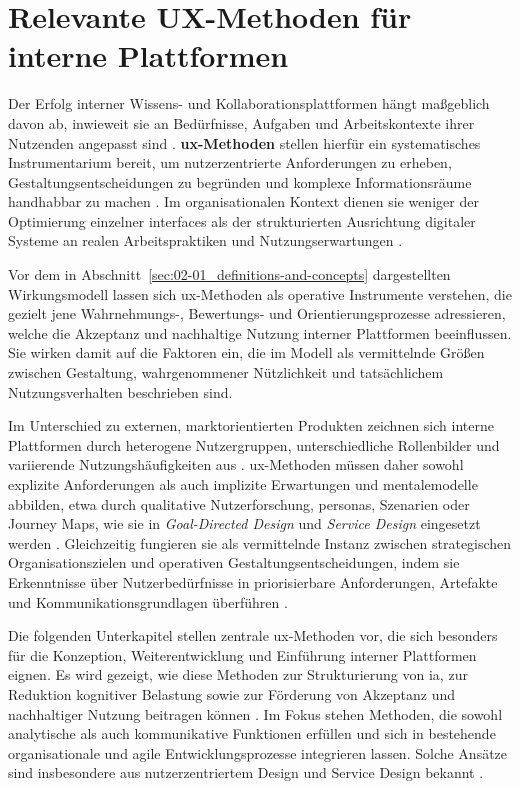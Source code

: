 \section{Relevante UX-Methoden für interne Plattformen}
\label{sec:02-02_ux-methods}

Der Erfolg interner Wissens- und Kollaborationsplattformen hängt maßgeblich davon ab, inwieweit sie an Bedürfnisse, Aufgaben und Arbeitskontexte ihrer Nutzenden angepasst sind \cite{300:FraunhoferIESE2018,406:Albers2015}. \textbf{\Gls{ux}-Methoden} stellen hierfür ein systematisches Instrumentarium bereit, um nutzerzentrierte Anforderungen zu erheben, Gestaltungsentscheidungen zu begründen und komplexe Informationsräume handhabbar zu machen \cite{401:Garrett2011,408:Hassenzahl2010,409:Cooper2014}. Im organisationalen Kontext dienen sie weniger der Optimierung einzelner \Glspl{interface} als der strukturierten Ausrichtung digitaler Systeme an realen Arbeitspraktiken und Nutzungserwartungen \cite{406:Albers2015,303:Rosenfeld2015,410:Stickdorn2018}.

Vor dem in Abschnitt~\ref{sec:02-01_definitions-and-concepts} dargestellten Wirkungsmodell lassen sich \Gls{ux}-Methoden als operative Instrumente verstehen, die gezielt jene Wahrnehmungs-, Bewertungs- und Orientierungsprozesse adressieren, welche die Akzeptanz und nachhaltige Nutzung interner Plattformen beeinflussen. Sie wirken damit auf die Faktoren ein, die im Modell als vermittelnde Größen zwischen Gestaltung, wahrgenommener Nützlichkeit und tatsächlichem Nutzungsverhalten beschrieben sind.

Im Unterschied zu externen, marktorientierten Produkten zeichnen sich interne Plattformen durch heterogene Nutzergruppen, unterschiedliche Rollenbilder und variierende Nutzungshäufigkeiten aus \cite{300:FraunhoferIESE2018,101:Khan2021}. \Gls{ux}-Methoden müssen daher sowohl explizite Anforderungen als auch implizite Erwartungen und \gls{mentalemodelle} abbilden, etwa durch qualitative Nutzerforschung, \Gls{personas}, Szenarien oder Journey Maps, wie sie in \textit{Goal-Directed Design} und \textit{Service Design} eingesetzt werden \cite{409:Cooper2014,410:Stickdorn2018,905:Norman1983}. Gleichzeitig fungieren sie als vermittelnde Instanz zwischen strategischen Organisationszielen und operativen Gestaltungsentscheidungen, indem sie Erkenntnisse über Nutzerbedürfnisse in priorisierbare Anforderungen, Artefakte und Kommunikationsgrundlagen überführen \cite{406:Albers2015,408:Hassenzahl2010,410:Stickdorn2018}.

Die folgenden Unterkapitel stellen zentrale \Gls{ux}-Methoden vor, die sich besonders für die Konzeption, Weiterentwicklung und Einführung interner Plattformen eignen. Es wird gezeigt, wie diese Methoden zur Strukturierung von \Gls{ia}, zur Reduktion kognitiver Belastung sowie zur Förderung von Akzeptanz und nachhaltiger Nutzung beitragen können \cite{303:Rosenfeld2015,105:Sweller1988}. Im Fokus stehen Methoden, die sowohl analytische als auch kommunikative Funktionen erfüllen und sich in bestehende organisationale und agile Entwicklungsprozesse integrieren lassen. Solche Ansätze sind insbesondere aus nutzerzentriertem Design und Service Design bekannt \cite{401:Garrett2011,409:Cooper2014,410:Stickdorn2018,406:Albers2015}.




